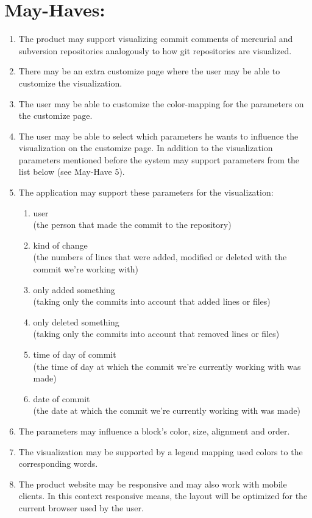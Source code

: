 \documentclass[12pt]{scrartcl}
\begin{document}
\section{May-Haves:}
\begin{enumerate}
\item The product may support visualizing commit comments of mercurial and
	subversion repositories analogously to how git repositories are
	visualized.
\item There may be an extra customize page where the user may be able to customize the visualization.
\item The user may be able to customize the color-mapping for the parameters on the customize page.
\item The user may be able to select which parameters he wants to influence the visualization on the customize page. In addition to the visualization parameters mentioned before the system may support parameters from the list below (see May-Have 5).
\item The application may support these parameters for the visualization:
\begin{enumerate}
\item user\\
(the person that made the commit to the repository)
\item kind of change\\  
(the numbers of lines that were added, modified or deleted with the commit we're working with)
\item only added something \\
(taking only the commits into account that added lines or files)
\item only deleted something\\
(taking only the commits into account that removed lines or files)
\item time of day of commit\\
(the time of day at which the commit we're currently working with was made)
\item date of commit\\
(the date at which the commit we're currently working with was made)
\end{enumerate}
\item The parameters may influence a block's color, size, alignment and order.
\item The visualization may be supported by a legend mapping used colors to the corresponding words.
\item The product website may be responsive and may also work with mobile clients. In this context responsive means, the layout will be optimized for the current browser used by the user.

\end{enumerate}
\end{document}
